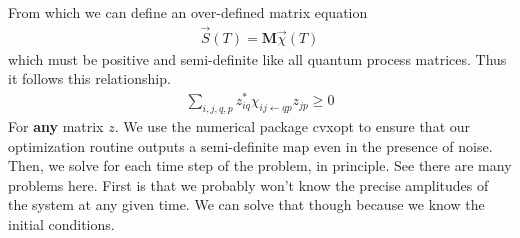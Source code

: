 From which we can define an over-defined matrix equation
\begin{align}
	\vec{S}(T) = \textbf{M} \vec{\chi}(T)
\end{align}
which must be positive and semi-definite like all quantum process matrices.  Thus it follows this relationship.
\begin{align}
	\sum_{i, j, q, p} z_{iq}^* \chi_{ij \leftarrow qp} z_{jp} \geq 0
\end{align}
For \textbf{any} matrix $z$.   We use the numerical package cvxopt to ensure that our optimization routine outputs a semi-definite map even in the presence of noise.  Then, we solve for each time step of the problem, in principle.  See there are many problems here.  First is that we probably won't know the precise amplitudes of the system at any given time.  We can solve that though because we know the initial conditions.

